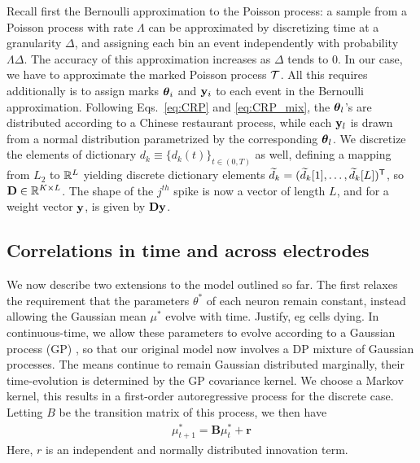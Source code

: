 Recall first the Bernoulli approximation to the Poisson process: a sample from a Poisson process with rate $\Lambda$ can be approximated by discretizing
time at a granularity $\Delta$, and assigning each bin an event independently with probability $\Lambda\Delta$. The accuracy of this approximation increases 
as $\Delta$ tends to $0$.
%
In our case, we have to approximate the marked Poisson process $\mathcal{T}$. All this requires additionally is to assign marks $\boldsymbol{\theta}_i$ and $\mathbf{y}_i$ to each event 
in the Bernoulli approximation. Following Eqs.~\eqref{eq:CRP} and \eqref{eq:CRP_mix}, the $\boldsymbol{\theta}_l$'s are distributed according
to a Chinese restaurant process, while each $\mathbf{y}_l$ is drawn from a normal distribution parametrized by the corresponding $\boldsymbol{\theta}_l$. We discretize the 
elements of dictionary $d_k \equiv \{d_k(t)\}_{t \in (0,T)}$ as well, defining a mapping from $L_2$ to $\mathbb{R}^L$ yielding discrete dictionary elements $\widetilde{d}_k=(\widetilde{d}_k[1], \ldots, \widetilde{d}_k[L])^{\mathsf{T}}$,  so  $\mathbf{D} \in \mathbb{R}^{K \times L}$. The shape of the $j^{th}$ spike is now a vector of length $L$, and for a weight vector
$\mathbf{y}$, is given by $\mathbf{D} \mathbf{y}$.

\subsection{Correlations in time and across electrodes}
We now describe two extensions to the model outlined so far. 
The first relaxes the requirement that the parameters $\theta^*$ of each neuron remain constant, instead allowing the Gaussian mean $\mu^*$ evolve
with time.  {\color{red} Justify, eg cells dying}. 
In continuous-time, we allow these parameters to evolve according to a Gaussian process (GP) \citep{}, so that our original model now involves a DP mixture 
of Gaussian processes. The means continue to remain Gaussian distributed marginally, their time-evolution is determined by the GP covariance kernel.
We choose a Markov kernel, this results in a first-order autoregressive process for the discrete case. Letting $B$ be the transition matrix of this
process, we then have
\begin{align}
  \mu^*_{t+1} = \mathbf{B} \mu^*_t + \mathbf{r}
\end{align}
Here, $r$ is an independent and normally distributed innovation term.

